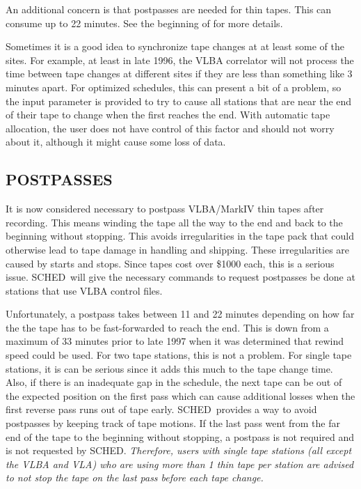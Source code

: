 \documentclass{report}
\newcommand{\sched}{{\sc SCHED}}
\newcommand{\schedb}{{\sc SCHED~}}
\begin{document}
An additional concern is that postpasses are needed for thin tapes.
This can consume up to 22 minutes.  See the beginning of
 for more details.

Sometimes it is a good idea to synchronize tape changes at at least
some of the sites.  For example, at least in late 1996, the VLBA
correlator will not process the time between tape changes at different
sites if they are less than something like 3 minutes apart.  For
optimized schedules, this can present a bit of a problem, so the
input parameter  is provided to
try to cause all stations that are near the end of their tape to
change when the first reaches the end.  With automatic tape allocation,
the user does not have control of this factor and should not worry
about it, although it might cause some loss of data.

\subsection{\label{SSSEC:POSTPASS}POSTPASSES}

It is now considered necessary to postpass VLBA/MarkIV thin tapes
after recording.  This means winding the tape all the way to the end
and back to the beginning without stopping.  This avoids
irregularities in the tape pack that could otherwise lead to tape
damage in handling and shipping.  These irregularities are caused by
starts and stops.  Since tapes cost over \$1000 each, this is a
serious issue.  \schedb will give the necessary commands to request
postpasses be done at stations that use VLBA control files.

Unfortunately, a postpass takes between 11 and 22 minutes depending on
how far the the tape has to be fast-forwarded to reach the end.  This
is down from a maximum of 33 minutes prior to late 1997 when it was
determined that rewind speed could be used.  For two tape stations,
this is not a problem.  For single tape stations, it is can be serious
since it adds this much to the tape change time.  Also, if there is an
inadequate gap in the schedule, the next tape can be out of the
expected position on the first pass which can cause additional losses
when the first reverse pass runs out of tape early.  \schedb provides
a way to avoid postpasses by keeping track of tape motions.  If the
last pass went from the far end of the tape to the beginning without
stopping, a postpass is not required and is not requested by \sched.
{\em Therefore, users with single tape stations (all except the VLBA
and VLA) who are using more than 1 thin tape per station are advised
to not stop the tape on the last pass before each tape change.}
\end{document}
